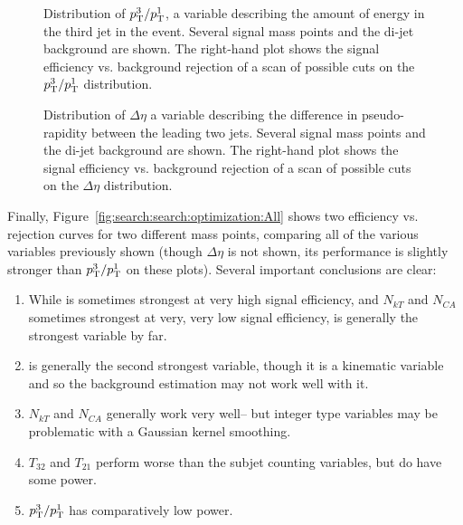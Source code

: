 




\begin{figure}
\centering
{}
\label{fig:search:search:optimization:PT31}
\caption{Distribution of $p_{\text{T}}^3/p_{\text{T}}^1$, a variable describing the amount of energy in the third jet in the event. Several signal mass points and the \herwigpp di-jet background are shown. The right-hand plot shows the signal efficiency vs. background rejection of a scan of possible cuts on the $p_{\text{T}}^3/p_{\text{T}}^1$ distribution.}
\end{figure}




\begin{figure}
\centering
{}
\label{fig:search:search:optimization:DEta}
\caption{Distribution of $\Delta \eta$ a variable describing the difference in pseudo-rapidity between the leading two jets. Several signal mass points and the \herwigpp di-jet background are shown. The right-hand plot shows the signal efficiency vs. background rejection of a scan of possible cuts on the $\Delta \eta$ distribution.}
\end{figure}


Finally, Figure~\ref{fig:search:search:optimization:All} shows two efficiency vs. rejection curves for two different mass points, comparing all of the various variables previously shown (though $\Delta \eta$ is not shown, its performance is slightly stronger than $p_{\text{T}}^3/p_{\text{T}}^1$ on these plots). Several important conclusions are clear:

\begin{enumerate}
\item While \Ht is sometimes strongest at very high signal efficiency, and $N_{kT}$ and $N_{CA}$ sometimes strongest at very, very low signal efficiency, \MJ is generally the strongest variable by far.
\item \Ht is generally the second strongest variable, though it is a kinematic variable and so the background estimation may not work well with it.
\item $N_{kT}$ and $N_{CA}$ generally work very well-- but integer type variables may be problematic with a Gaussian kernel smoothing.
\item $T_{32}$ and $T_{21}$ perform worse than the subjet counting variables, but do have some power.
\item $p_{\text{T}}^3/p_{\text{T}}^1$ has comparatively low power.
\end{enumerate}


